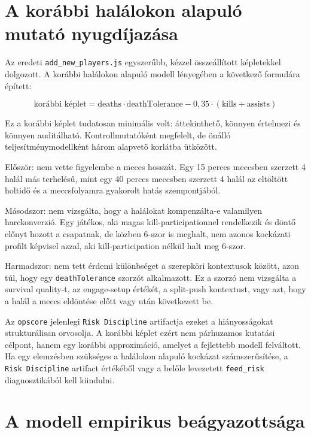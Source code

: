 ﻿\documentclass[a4paper,12pt]{report}
\begin{document}
\section{A korábbi halálokon alapuló mutató nyugdíjazása}

Az eredeti \texttt{add\_new\_players.js} egyszerűbb, kézzel összeállított képletekkel dolgozott. A korábbi halálokon alapuló modell lényegében a következő formulára épített:

\begin{equation}
\text{korábbi képlet} = \text{deaths} \cdot \text{deathTolerance} - 0{,}35 \cdot (\text{kills} + \text{assists})
\end{equation}

Ez a korábbi képlet tudatosan minimális volt: áttekinthető, könnyen értelmezi és könnyen auditálható. Kontrollmutatóként megfelelt, de önálló teljesítménymodellként három alapvető korlátba ütközött.

Először: nem vette figyelembe a meccs hosszát. Egy 15 perces meccsben szerzett 4 halál más terhelésű, mint egy 40 perces meccsben szerzett 4 halál az eltöltött holtidő és a meccsfolyamra gyakorolt hatás szempontjából.

Másodszor: nem vizsgálta, hogy a halálokat kompenzálta-e valamilyen harckonverzió. Egy játékos, aki magas kill-participationnel rendelkezik és döntő előnyt hozott a csapatnak, de közben 6-szor is meghalt, nem azonos kockázati profilt képvisel azzal, aki kill-participation nélkül halt meg 6-szor.

Harmadszor: nem tett érdemi különbséget a szerepköri kontextusok között, azon túl, hogy egy \texttt{deathTolerance} szorzót alkalmazott. Ez a szorzó nem vizsgálta a survival quality-t, az engage-setup értékét, a split-push kontextust, vagy azt, hogy a halál a meccs eldöntése előtt vagy után következett be.

Az \texttt{opscore} jelenlegi \texttt{Risk Discipline} artifactja ezeket a hiányosságokat strukturálisan orvosolja. A korábbi képlet ezért nem párhuzamos kutatási célpont, hanem egy korábbi approximáció, amelyet a fejlettebb modell felváltott. Ha egy elemzésben szükséges a halálokon alapuló kockázat számszerűsítése, a \texttt{Risk Discipline} artifact értékéből vagy a belőle levezetett \texttt{feed\_risk} diagnosztikából kell kiindulni.

\section{A modell empirikus beágyazottsága}
\end{document}
